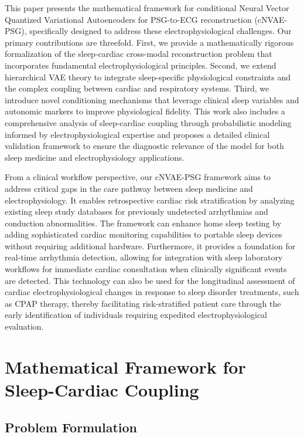 \documentclass[11pt,en]{elegantpaper}
\begin{document}
This paper presents the mathematical framework for conditional Neural Vector Quantized Variational Autoencoders for PSG-to-ECG reconstruction (cNVAE-PSG), specifically designed to address these electrophysiological challenges. Our primary contributions are threefold. First, we provide a mathematically rigorous formalization of the sleep-cardiac cross-modal reconstruction problem that incorporates fundamental electrophysiological principles. Second, we extend hierarchical VAE theory to integrate sleep-specific physiological constraints and the complex coupling between cardiac and respiratory systems. Third, we introduce novel conditioning mechanisms that leverage clinical sleep variables and autonomic markers to improve physiological fidelity. This work also includes a comprehensive analysis of sleep-cardiac coupling through probabilistic modeling informed by electrophysiological expertise and proposes a detailed clinical validation framework to ensure the diagnostic relevance of the model for both sleep medicine and electrophysiology applications.

From a clinical workflow perspective, our cNVAE-PSG framework aims to address critical gaps in the care pathway between sleep medicine and electrophysiology. It enables retrospective cardiac risk stratification by analyzing existing sleep study databases for previously undetected arrhythmias and conduction abnormalities. The framework can enhance home sleep testing by adding sophisticated cardiac monitoring capabilities to portable sleep devices without requiring additional hardware. Furthermore, it provides a foundation for real-time arrhythmia detection, allowing for integration with sleep laboratory workflows for immediate cardiac consultation when clinically significant events are detected. This technology can also be used for the longitudinal assessment of cardiac electrophysiological changes in response to sleep disorder treatments, such as CPAP therapy, thereby facilitating risk-stratified patient care through the early identification of individuals requiring expedited electrophysiological evaluation.

\section{Mathematical Framework for Sleep-Cardiac Coupling}

\subsection{Problem Formulation}
\end{document}
